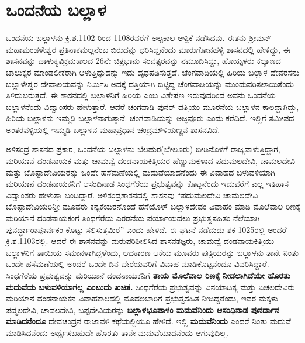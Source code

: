 \section{ಒಂದನೆಯ ಬಲ್ಲಾಳ}

ಒಂದನೆಯ ಬಲ್ಲಾಳನು ಕ್ರಿ.ಶ.1102 ರಿಂದ 1108ರವರೆಗೆ ಅಲ್ಪಕಾಲ ಆಳ್ವಿಕೆ ನಡೆಸಿದನು. ಈತನು ಶ‍್ರೀಮನ್​ಮಹಾಮಂಡಳೇಶ್ವರ ಪ್ರತಿನಾಕಮಲ್ಲನೆಂಬ ಬಿರುದನ್ನು ಧರಿಸಿದ್ದನೆಂದು ಮಾರುಗೋನಹಳ್ಳಿ ಶಾಸನದಲ್ಲಿ ಹೇಳಿದ್ದು, ಈ ಶಾಸನವನ್ನು ಚಾಳುಕ್ಯವಿಕ್ರಮ\-ಕಾಲದ 26ನೇ ಚಿತ್ರಭಾನು ಸಂವತ್ಸರವನ್ನು ನಮೂದಿಸಿದ್ದು, ಹೊಯ್ಸಳರು ಕಲ್ಯಾಣದ ಚಾಲುಕ್ಯರ ಮಾಂಡಲೀಕರಾಗಿ ಆಳುತ್ತಿದ್ದುದನ್ನು ಇದು ದೃಢಪಡಿಸುತ್ತದೆ. ಚೆಂಗವಾಡಿಯಲ್ಲಿ ಹಿರಿಯ ಬಲ್ಲಾಳ ದೇವರಸನು ಬಲ್ಲಾಳೇಶ್ವರ ದೇವಾಲಯವನ್ನು ನಿರ್ಮಿಸಿ ಅದಕ್ಕೆ ದತ್ತಿಯಾಗಿ ಬಿಟ್ಟಿದ್ದ ಚೆಂಗವಾಡಿಯನ್ನು ಮುಂದುವರಿಸಲಾಯಿತೆಂದು ತಿಳಿದುಬರುತ್ತದೆ. ಈ ಶಾಸನದಲ್ಲಿ ಬಲ್ಲಾಳನಿಗೆ ಹಿರಿಯ ಎಂಬ ವಿಶೇಷಣ ಇರುವುದರಿಂದ ಅವನು ಒಂದನೆಯ ಬಲ್ಲಾಳನೆಂದು ವಿದ್ವಾಂಸರು ಹೇಳುತ್ತಾರೆ. ಆದರೆ ಚಂಗವಾಡಿ ಪುನರ್​ ದತ್ತಿಯು ಮೂರನೆಯ ಬಲ್ಲಾಳನ ಕಾಲದ್ದಾಗಿದ್ದು, ಹಿರಿಯ ಬಲ್ಲಾಳನು ಇಮ್ಮಡಿ ಬಲ್ಲಾಳನಾಗುತ್ತಾನೆ. ಚಂಗವಾಡಿಯನ್ನು ಅಜ್ಜವೂರು ಎಂದು ಕರೆದಿದೆ. ಇಲ್ಲಿಗೆ ಸಮೀಪದ ಅಂತರವಳ್ಳಿಯಲ್ಲಿ ಇಮ್ಮಡಿ ಬಲ್ಲಾಳನ ಮಹಾಪ್ರಧಾನ ಚಂದ್ರಮೌಳಿಯಣ್ಣನ ಶಾಸನವಿದೆ.

ಅಳಿಸಂದ್ರ ಶಾಸನದ ಪ್ರಕಾರ, ಒಂದನೆಯ ಬಲ್ಲಾಳನು ಬೆಲಹುರ(ಬೇಲೂರು) ಬೀಡಿನೊಳಗೆ ರಾಜ್ಯವಾಳುತ್ತಿದ್ದಾಗ, ಮರಿಯಾನೆ ದಂಡನಾಯಕ ಮತ್ತು ಚಾಮವ್ವೆ ದಂಡನಾಯಕಿತ್ತಿಯರ ಹೆಣ್ಣುಮಕ್ಕಳಾದ ಪದುಮಲದೇವಿ, ಚಾಮಲದೇವಿ ಮತ್ತು ಬೊಪ್ಪಾದೇವಿಯರನ್ನು ಒಂದೇ ಹಸೆಮಣೆಯಲ್ಲಿ ಮದುವೆಯಾದನೆಂದು ಈ ವಿವಾಹದ ಬಳುವಳಿಯಾಗಿ ಮರಿಯಾನೆ ದಂಡನಾಯಕನಿಗೆ ಆಸಂದಿನಾಡ ಸಿಂಧಗೆರೆಯ ಪ್ರಭುತ್ವವನ್ನು ಕೊಟ್ಟನೆಂದು ಇದುವರೆಗೆ ಎಲ್ಲ ಇತಿಹಾಸ ವಿದ್ವಾಂಸರು ಹೇಳುತ್ತಾ ಬಂದಿದ್ದಾರೆ. ಅಳಿಸಂದ್ರಶಾಸನದಲ್ಲಿ ಶಾಸನವು “ಪದುಮಲದೇವಿ ಚಾಮಲದೇವಿ ಬೊಪ್ಪಾದೇವಿಯರಿನ್ತೀ ಮೂವರು ಕನ್ಯಕೆಯರನೊಂದೆ ಹಸೆಯೊಳ್​ ಬಲ್ಲಾಳದೇವಂ ವಿವಾಹಂ ಮಾಡಿ ಮೊಲೆವಾಲ ರಿಣಕ್ಕೆ ಮರಿಯಾನೆ ದಂಡನಾಯಕಂಗೆ ಸಿಂಧಗೆರೆಯ ಎರಡನೆಯ ಪರ್ಯಾಯದಲು ಪ್ರಭುತ್ವಸಹಿತಂ ನೆಲೆಯಾಗಿ ಪುನರ್ದ್ಧಾರಾಪೂರ್ವಕಂ ಕೊಟ್ಟು ಸಲಿಸುತ್ತಮಿರೆ” ಎಂದು ಹೇಳಿದೆ. ಈ ಘಟನೆ ನಡೆದುದು ಶಕ 1025ರಲ್ಲಿ ಅಂದರೆ ಕ್ರಿ.ಶ.1103ರಲ್ಲಿ. ಆದರೆ ಈ ಶಾಸನವನ್ನು ಮರುಪರಿಶೀಲಿಸಿದ ಶಾಸನತಜ್ಞರು, ಚಾಮವ್ವೆ ದಂಡನಾಯಕಿತ್ತಿಯು ಬಲ್ಲಾಳನಿಗೆ ತಾಯಿಯ ಸಮಾನಳಾಗಿದ್ದಳೆಂದು, ಆದಕಾರಣ ಆಕೆಯ ಮೂವರು ಪುತ್ರಿಯರನ್ನು ಬಲ್ಲಾಳನು ತಾನೇ ನಿಂತು ಒಂದೇ ಹಸೆಮಣೆಯಲ್ಲಿ ಅಂದರೆ ಒಂದೇ ದಿನ ಬೇರೆಯವರಿಗೆ ವಿವಾಹ ಮಾಡಿಕೊಟ್ಟನೆಂದೂ ವಿವರಿಸಿದ್ದಾರೆ. ಸಿಂಧಗೆರೆಯ ಪ್ರಭುತ್ವವನ್ನು ಮರಿಯಾನೆ ದಂಡನಾಯಕನಿಗೆ \textbf{ತಾಯ ಮೊಲೆವಾಲ ರಿಣಕ್ಕೆ ನೀಡಲಾಗಿದೆಯೇ ಹೊರತು ಮದುವೆಯ ಬಳುವಳಿಯಾಗಲ್ಲ ಎಂಬುದು ಖಚಿತ. }ಸಿಂಧಗೆರೆಯ ಪ್ರಭುತ್ವವನ್ನು ವಿನಯಾದಿತ್ಯ ಮತ್ತು ಏಚಲದೇವಿರು ಮರಿಯಾನೆ ದಂಡನಾಯಕನ ವಿವಾಹಕಾಲದಲ್ಲಿ ಮೊದಲಬಾರಿಗೆ ಪ್ರಭುತ್ವಸಹಿತ ನೀಡಿದ್ದರೆಂದು, ಇವರ ಮಕ್ಕಳು ಪದ್ಮಲದೇವಿ, ಚಾವಲದೇವಿ, ಬಪ್ಪದೇವಿಯರನ್ನು \textbf{ಬಲ್ಲಾಳಭೂಪಾಳಂ ಮದುವೆನಿಂದು ಆಸಂಧಿನಾಡ ಪುನರ್ದಾನ ಮಾಡಿದನೆಂದೂ} ದೇವಚಂದ್ರನ ರಾಜಾವಳಿ ಕಥೆಯಲ್ಲಿಯೂ ಹೇಳಿದೆ. ಇಲ್ಲಿ \textbf{ಮದುವೆನಿಂದು} ಎಂದರೆ ನಿಂತು ಮದುವೆ ಮಾಡಿಸಿದನೆಂದು ಅರ್ಥೈಸಬಹುದೇ ಹೊರತು ತಾನೇ ಮದುವೆಯಾದನೆಂದು ಆಗುವುದಿಲ್ಲ.

